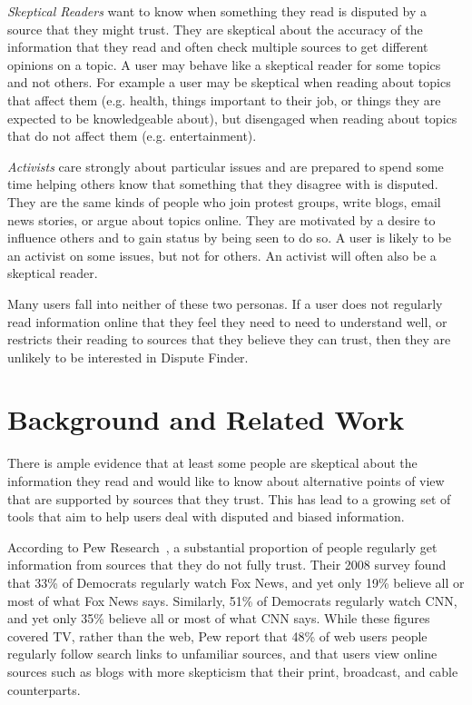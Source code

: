 \documentclass{www2010-submission}
\begin{document}
{\it Skeptical Readers} want to know when something they read is disputed by a source that they might trust. They are skeptical about the accuracy of the information that they read and often check multiple sources to get different opinions on a topic. A user may behave like a skeptical reader for some topics and not others. For example a user may be skeptical when reading about topics that affect them (e.g. health, things important to their job, or things they are expected to be knowledgeable about), but disengaged when reading about topics that do not affect them (e.g. entertainment).

{\it Activists} care strongly about particular issues and are prepared to spend some time helping others know that something that they disagree with is disputed. They are the same kinds of people who join protest groups, write blogs, email news stories, or argue about topics online. They are motivated by a desire to influence others and to gain status by being seen to do so. A user is likely to be an activist on some issues, but not for others. An activist will often also be a skeptical reader.

Many users fall into neither of these two personas. If a user does not regularly read information online that they feel they need to need to understand well, or restricts their reading to sources that they believe they can trust, then they are unlikely to be interested in Dispute Finder.


\section{Background and Related Work}

There is ample evidence that at least some people are skeptical about the information they read and would like to know about alternative points of view that are supported by sources that they trust. This has lead to a growing set of tools that aim to help users deal with disputed and biased information.

According to Pew Research~\cite{PewResearch2008}, a substantial proportion of people regularly get information from sources that they do not fully trust. Their 2008 survey found that 33\% of Democrats regularly watch Fox News, and yet only 19\% believe all or most of what Fox News says. Similarly, 51\% of Democrats regularly watch CNN, and yet only 35\% believe all or most of what CNN says. While these figures covered TV, rather than the web, Pew report that 48\% of web users people regularly follow search links to unfamiliar sources, and that users view online sources such as blogs with more skepticism that their print, broadcast, and cable counterparts. 
\end{document}

